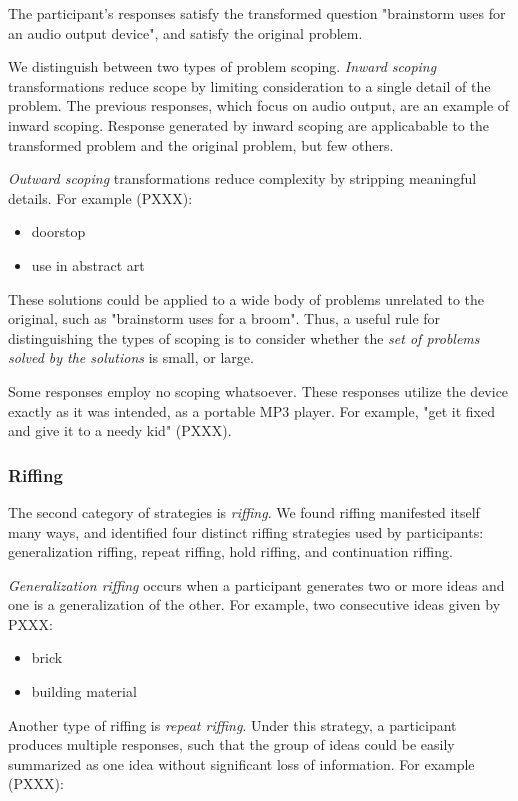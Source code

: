 The participant's responses satisfy the transformed question "brainstorm uses for an audio output device", and satisfy the original problem.

We distinguish between two types of problem scoping. \emph{Inward scoping} transformations reduce scope by limiting consideration to a single detail of the problem. The previous responses, which focus on audio output, are an example of inward scoping. Response generated by inward scoping are applicabable to the transformed problem and the original problem, but few others.

\emph{Outward scoping} transformations reduce complexity by stripping meaningful details. For example (PXXX):

\begin{itemize}
    \item doorstop
    \item use in abstract art
\end{itemize}

These solutions could be applied to a wide body of problems unrelated to the original, such as "brainstorm uses for a broom".
Thus, a useful rule for distinguishing the types of scoping is to consider whether the \emph{set of problems solved by the solutions} is small, or large.

Some responses employ no scoping whatsoever. These responses utilize the device exactly as it was intended, as a portable MP3 player. For example, "get it fixed and give it to a needy kid" (PXXX).

\subsubsection{Riffing}

The second category of strategies is \emph{riffing}.
We found riffing manifested itself many ways, and identified four distinct riffing strategies used by participants: generalization riffing, repeat riffing, hold riffing, and continuation riffing. 

\emph{Generalization riffing} occurs when a participant generates two or more ideas and one is a generalization of the other. For example, two consecutive ideas given by PXXX:

\begin{itemize}
    \item brick
    \item building material
\end{itemize}

Another type of riffing is \emph{repeat riffing}. Under this strategy, a participant produces multiple responses, such that the group of ideas could be easily summarized as one idea without significant loss of information. For example (PXXX):

